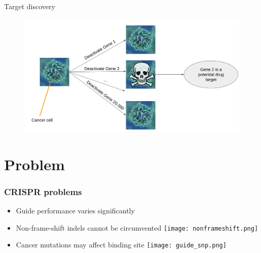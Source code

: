 \documentclass[Nike]{tuberlinbeamer}
\begin{document}
\begin{frame}{Target discovery}
  \begin{figure}
    \includegraphics[width=\linewidth]{targetdiscovery.png}
  \end{figure}
\end{frame}

\section{Problem}


\begin{frame}
  \frametitle{CRISPR problems}
  \begin{itemize}
    \item Guide performance varies significantly
    \pause
      \vspace{0.1cm}
    \item Non-frame-shift indels cannot be circumvented
      \texttt{[image: nonframeshift.png]}
    \pause
    \item Cancer mutations may affect binding site
      \vspace{0.2cm}
      \texttt{[image: guide\_snp.png]}
  \end{itemize}
\end{frame}
\end{document}
